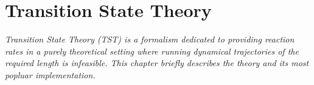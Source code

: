 \chapter{Transition State Theory}
\label{chap:tst}
\textit{Transition State Theory (TST) is a formalism dedicated to providing reaction rates in a purely theoretical setting where running dynamical trajectories of the required length is infeasible.
This chapter briefly describes the theory and its most popluar implementation.}



